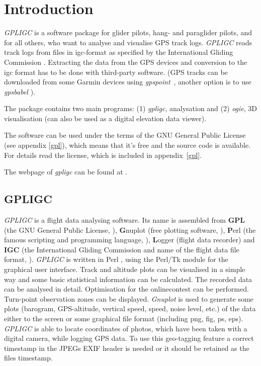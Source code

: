 \section{Introduction}
\emph{GPLIGC} is a software package for glider pilots, hang- and paraglider pilots, and for all others,
who want to analyse and visualise GPS track logs.
\emph{GPLIGC} reads track logs from files in igc-format as specified by the International Gliding Commission \cite{igc}.
Extracting the data from the GPS devices and conversion to the igc format has to be done with third-party software.
(GPS tracks can be downloaded from some Garmin devices using \emph{gpspoint}~\cite{gpspoint},
another option is to use \emph{gpsbabel} \cite{gpsbabel}).

The package contains two main programs: (1) \emph{gpligc}, analysation and (2) \emph{ogie},
3D visualisation (can also be used as a digital elevation data viewer).

The software can be used under the terms of the GNU General Public License (see appendix \ref{gpl}),
which means that it's free and the source code is available.
For details read the license, which is included in appendix~\ref{gpl}.

The webpage of \emph{gpligc} can be found at \cite{gpligc}.

\subsection{GPLIGC}
\emph{GPLIGC} is a flight data analysing software. Its name is assembled from \textbf{GPL} (the GNU General Public License, \cite{fsf}), \textbf{G}nuplot (free plotting software, \cite{gnuplot}), \textbf{P}erl (the famous scripting and programming language, \cite{perl}), \textbf{L}ogger (flight data recorder) and \textbf{IGC} (the International Gliding Commission and name of the flight data file format, \cite{igc}).
\emph{GPLIGC} is written in Perl \cite{perl}, using the Perl/Tk module \cite{perltk} for the graphical user interface.
Track and altitude plots can be visualised in a simple way and some basic statistical information can be calculated.
The recorded data can be analysed in detail.
Optimisation for the onlinecontest can be performed. Turn-point observation zones can be displayed.
\emph{Gnuplot} \cite{gnuplot} is used to generate some plots (barogram, GPS-altitude, vertical speed, speed, noise level, etc.) of the data either to the screen or some graphical file format (including png, fig, ps, eps).
\emph{GPLIGC} is able to locate coordinates of photos, which have been taken with a digital camera, while logging GPS data.
To use this geo-tagging feature a correct timestamp in the JPEGs EXIF header is needed or it should be retained as the files timestamp.

